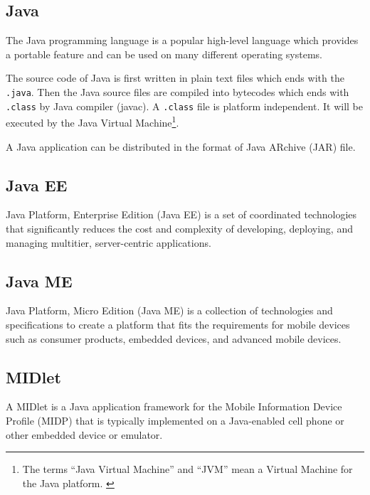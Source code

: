 
\subsection*{Java}
\label{sec:Java}

The Java\texttrademark{} programming language is a popular high-level language which provides a portable feature and can be used on many different operating systems. 

The source code of Java is first written in plain text files which ends with the \nolinebreak\texttt{.java}. Then the Java source files are compiled into bytecodes which ends with \nolinebreak\texttt{.class} by Java compiler (javac). A \nolinebreak\texttt{.class} file is platform independent. It will be executed by the Java Virtual Machine\label{sym:JVM}\footnote{The terms ``Java Virtual Machine'' and ``JVM'' mean a Virtual Machine for the Java platform. \cite{TheJavaProgrammingLanguage}}.\cite{TheJavaProgrammingLanguage}

A Java application can be distributed in the format of Java ARchive (JAR\label{sym:JAR}) file.

\subsection*{Java EE}
\label{sec:JavaEE}
\label{sym:JavaEE}

Java Platform, Enterprise Edition (Java EE) is a set of coordinated technologies that significantly reduces the cost and complexity of developing, deploying, and managing multitier, server-centric applications.\cite{JavaEETechnology}


\subsection*{Java ME}
\label{sec:JavaME}
\label{sym:JavaME}

Java Platform, Micro Edition (Java ME) is a collection of technologies and specifications to create a platform that fits the requirements for mobile devices such as consumer products, embedded devices, and advanced mobile devices.\cite{JavaMETechnology}

\subsection*{MIDlet}
\label{sec:MIDlet}
\label{sym:MIDlet}

A MIDlet is a Java application framework for the Mobile Information Device Profile (MIDP\label{sym:MIDP}) that is typically implemented on a Java-enabled cell phone or other embedded device or emulator.

